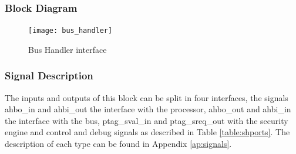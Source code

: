 \subsubsection{Block Diagram}

\begin{figure}[!ht]
    \centering
    \texttt{[image: bus\_handler]}
    \caption{Bus Handler  interface }
    \label{fig:bhbb}
\end{figure}


\subsubsection{Signal Description}

The inputs and outputs of this block can be split in four interfaces,
the signals  ahbo\_in and ahbi\_out the interface with the processor,  ahbo\_out  and ahbi\_in
the interface with the bus, ptag\_sval\_in and ptag\_sreq\_out with the security engine and control and debug signals as described in Table \ref{table:shports}.
 The description of each type can be found in Appendix \ref{ap:signals}.

